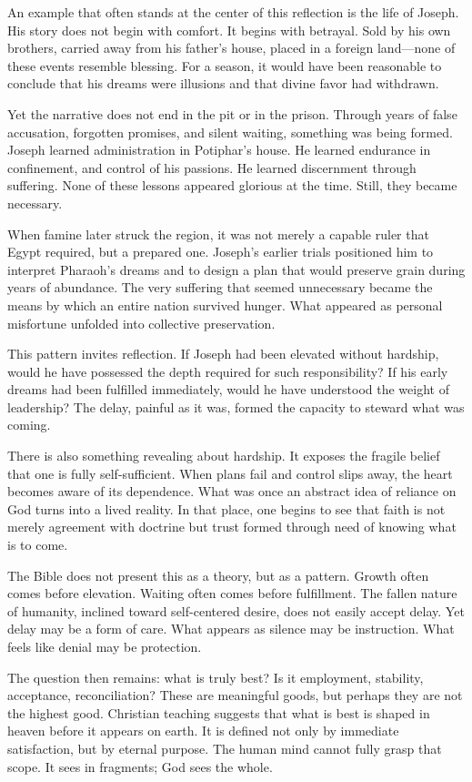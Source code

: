 \documentclass[12pt]{article}
\begin{document}
An example that often stands at the center of this reflection is the life of
Joseph. His story does not begin with comfort. It begins with betrayal. Sold by
his own brothers, carried away from his father’s house, placed in a foreign
land—none of these events resemble blessing. For a season, it would have been
reasonable to conclude that his dreams were illusions and that divine favor had
withdrawn.

Yet the narrative does not end in the pit or in the prison. Through years of
false accusation, forgotten promises, and silent waiting, something was being
formed. Joseph learned administration in Potiphar’s house. He learned endurance
in confinement, and control of his passions. He learned discernment through
suffering. None of these lessons appeared glorious at the time. Still, they
became necessary.

When famine later struck the region, it was not merely a capable ruler that
Egypt required, but a prepared one. Joseph’s earlier trials positioned him to
interpret Pharaoh’s dreams and to design a plan that would preserve grain during
years of abundance. The very suffering that seemed unnecessary became the means
by which an entire nation survived hunger. What appeared as personal misfortune
unfolded into collective preservation.

This pattern invites reflection. If Joseph had been elevated without hardship,
would he have possessed the depth required for such responsibility? If his early
dreams had been fulfilled immediately, would he have understood the weight of
leadership? The delay, painful as it was, formed the capacity to steward what
was coming.

There is also something revealing about hardship. It exposes the fragile belief
that one is fully self-sufficient. When plans fail and control slips away, the
heart becomes aware of its dependence. What was once an abstract idea of reliance
on God turns into a lived reality. In that place, one begins to see that faith
is not merely agreement with doctrine but trust formed through need of knowing
what is to come.

The Bible does not present this as a theory, but as a pattern. Growth often
comes before elevation. Waiting often comes before fulfillment. The fallen
nature of humanity, inclined toward self-centered desire, does not easily accept
delay. Yet delay may be a form of care. What appears as silence may be
instruction. What feels like denial may be protection.

The question then remains: what is truly best? Is it employment, stability,
acceptance, reconciliation? These are meaningful goods, but perhaps they are not
the highest good. Christian teaching suggests that what is best is shaped in
heaven before it appears on earth. It is defined not only by immediate
satisfaction, but by eternal purpose. The human mind cannot fully grasp that
scope. It sees in fragments; God sees the whole.
\end{document}
